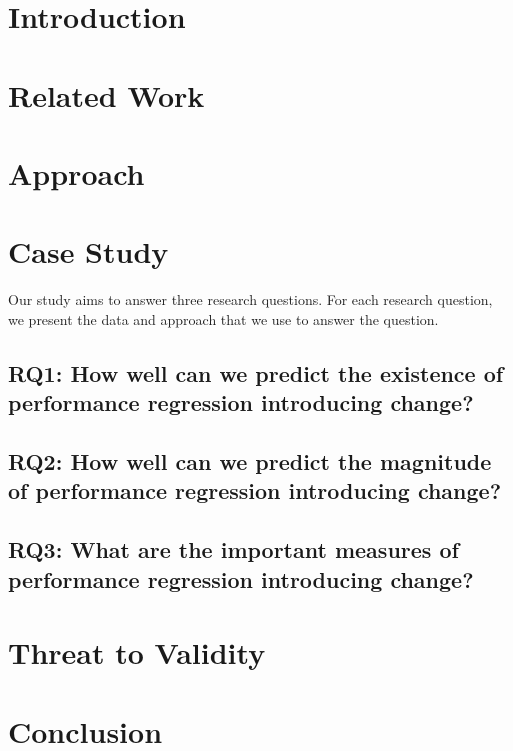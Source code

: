 \documentclass[conference]{IEEEtran}
\begin{document}
%
\IEEEpeerreviewmaketitle

\section{Introduction}
\label{sec:intro}


\section{Related Work}
\label{sec:related}


\section{Approach}
\label{sec:case}


\section{Case Study}
\label{sec:results}

Our study aims to answer three research questions. For each research question, we present 
the data and approach that we use to answer the question.

\subsection*{RQ1: How well can we predict the existence of performance regression introducing change?}


\subsection*{RQ2: How well can we predict the magnitude of performance regression introducing change?}


\subsection*{RQ3: What are the important measures of performance regression introducing change?}



%

\section{Threat to Validity}
\label{sec:threats}


\section{Conclusion}
\label{sec:conclusion}



 


\end{document}
